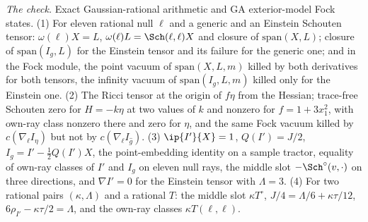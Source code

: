\emph{The check.} Exact Gaussian-rational arithmetic and GA exterior-model Fock states. (1) For eleven rational null $\ell$ and a generic and an Einstein Schouten tensor: $\omega(\ell)X = L$, $\omega(\ell)L = \Sch(\ell,\ell)X$ and closure of $\mathrm{span}(X, L)$; closure of $\mathrm{span}(I_{g}, L)$ for the Einstein tensor and its failure for the generic one; and in the Fock module, the point vacuum of $\mathrm{span}(X, L, m)$ killed by both derivatives for both tensors, the infinity vacuum of $\mathrm{span}(I_{g}, L, m)$ killed only for the Einstein one. (2) The Ricci tensor at the origin of $f\eta$ from the Hessian; trace-free Schouten zero for $H = -k\eta$ at two values of $k$ and nonzero for $f = 1 + 3x_{1}^{2}$, with own-ray class nonzero there and zero for $\eta$, and the same Fock vacuum killed by $c(\nabla_{\ell}I_{\eta})$ but not by $c(\nabla_{\ell}I_{\hat g})$. (3) $\ip{I'}{X} = 1$, $Q(I') = J/2$, $I_{g} = I' - \tfrac12 Q(I')X$, the point-embedding identity on a sample tractor, equality of own-ray classes of $I'$ and $I_{g}$ on eleven null rays, the middle slot $-\Sch^{\circ}(v,\cdot)$ on three directions, and $\nabla I' = 0$ for the Einstein tensor with $\Lambda = 3$. (4) For two rational pairs $(\kappa, \Lambda)$ and a rational $T$: the middle slot $\kappa T^{\circ}$, $J/4 = \Lambda/6 + \kappa\tau/12$, $6\rho_{I'} - \kappa\tau/2 = \Lambda$, and the own-ray classes $\kappa T(\ell,\ell)$.
